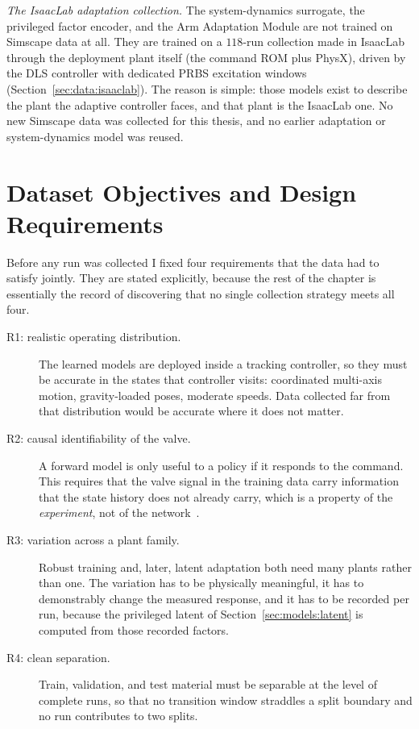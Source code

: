 \emph{The IsaacLab adaptation collection.} The system-dynamics
surrogate, the privileged factor encoder, and the Arm Adaptation Module
are not trained on Simscape data at all. They are trained on a
$118$-run collection made in IsaacLab through the deployment plant itself
(the command ROM plus PhysX), driven by the DLS controller
with dedicated PRBS excitation windows
(Section~\ref{sec:data:isaaclab}). The reason is simple: those models
exist to describe the plant the adaptive controller faces,
and that plant is the IsaacLab one. No new Simscape data was collected
for this thesis, and no earlier adaptation or system-dynamics model was
reused.

\section{Dataset Objectives and Design Requirements}
\label{sec:data:objectives}



Before any run was collected I fixed four requirements that the data had
to satisfy jointly. They are stated explicitly, because the rest
of the chapter is essentially the record of discovering that no single
collection strategy meets all four.

\begin{description}
  \item[R1: realistic operating distribution.] The learned models are
    deployed inside a tracking controller, so they must be accurate in
    the states that controller visits: coordinated multi-axis
    motion, gravity-loaded poses, moderate speeds. Data collected far
    from that distribution would be accurate where it does not matter.
  \item[R2: causal identifiability of the valve.] A forward model is
    only useful to a policy if it responds to the command. This requires
    that the valve signal in the training data carry information that the
    state history does not already carry, which is a property of the
    \emph{experiment}, not of the network~\cite{ljung1999system,
    isermann2011identification}.
  \item[R3: variation across a plant family.] Robust training and, later,
    latent adaptation both need many plants rather than one. The
    variation has to be physically meaningful, it has to demonstrably
    change the measured response, and it has to be recorded per run,
    because the privileged latent of Section~\ref{sec:models:latent} is computed from those recorded factors.
  \item[R4: clean separation.] Train, validation, and test material must
    be separable at the level of complete runs, so that no transition
    window straddles a split boundary and no run contributes to two
    splits.
\end{description}

